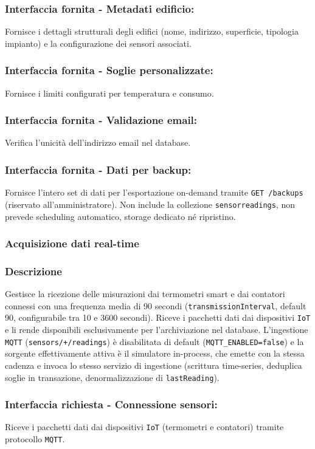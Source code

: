         \subsubsection*{Interfaccia fornita - Metadati edificio:}
            Fornisce i dettagli strutturali degli edifici (nome, indirizzo, superficie, tipologia impianto) e la configurazione dei sensori associati.
        \subsubsection*{Interfaccia fornita - Soglie personalizzate:}
            Fornisce i limiti configurati per temperatura e consumo.
        \subsubsection*{Interfaccia fornita - Validazione email:}
            Verifica l'unicità dell'indirizzo email nel database.
        \subsubsection*{Interfaccia fornita - Dati per backup:}
            Fornisce l'intero set di dati per l'esportazione on-demand tramite \texttt{GET /backups} (riservato all'amministratore). Non include la collezione \texttt{sensorreadings}, non prevede scheduling automatico, storage dedicato n\'e ripristino.

    \subsubsection{Acquisizione dati real-time}
        \subsubsection*{Descrizione}
            Gestisce la ricezione delle misurazioni dai termometri smart e dai contatori connessi con una frequenza media di 90 secondi (\texttt{transmissionInterval}, default 90, configurabile tra 10 e 3600 secondi). Riceve i pacchetti dati dai dispositivi \texttt{IoT} e li rende disponibili esclusivamente per l'archiviazione nel database. L'ingestione \texttt{MQTT} (\texttt{sensors/+/readings}) \`e disabilitata di default (\texttt{MQTT\_ENABLED=false}) e la sorgente effettivamente attiva \`e il simulatore in-process, che emette con la stessa cadenza e invoca lo stesso servizio di ingestione (scrittura time-series, deduplica soglie in transazione, denormalizzazione di \texttt{lastReading}).
        \subsubsection*{Interfaccia richiesta - Connessione sensori:}
            Riceve i pacchetti dati dai dispositivi \texttt{IoT} (termometri e contatori) tramite protocollo \texttt{MQTT}.
